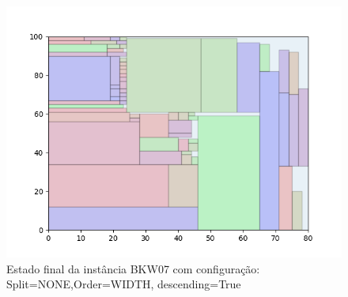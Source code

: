 \begin{figure}[H]
    \centering
    \caption[]{Estado final da instância BKW07 com configuração: Split=NONE,Order=WIDTH, descending=True}
    \label{fig:bkw07-none-width-true}
    \includegraphics[scale=0.5]{output/figures/bkw/bkw07/none/width/true/00}
\end{figure}